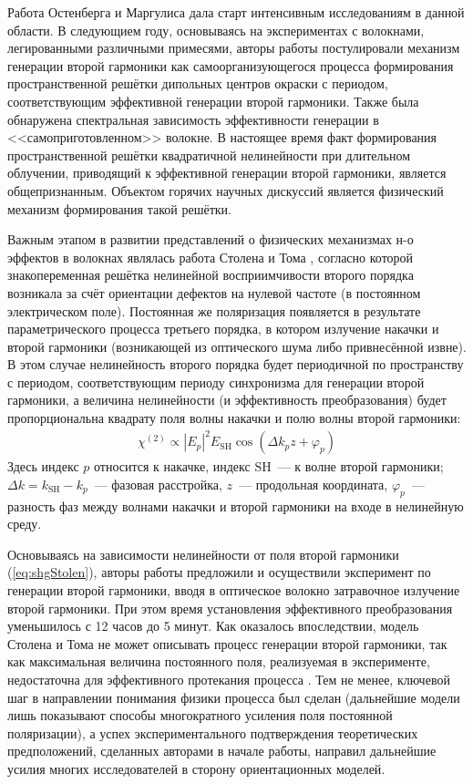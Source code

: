 Работа Остенберга и Маргулиса дала старт интенсивным исследованиям в данной области. В следующием году, основываясь на экспериментах с волокнами, легированными различными примесями, авторы работы \cite{farries1987second} постулировали механизм генерации второй гармоники как \textsf{самоорганизующегося процесса формирования пространственной решётки} дипольных центров окраски с периодом, соответствующим эффективной генерации второй гармоники. Также была обнаружена спектральная зависимость эффективности генерации в <<самоприготовленном>> волокне. В настоящее время факт формирования пространственной решётки квадратичной нелинейности при длительном облучении, приводящий к эффективной генерации второй гармоники, является общепризнанным. Объектом горячих научных дискуссий является физический механизм формирования такой решётки.

Важным этапом в развитии представлений о физических механизмах н-о эффектов в волокнах являлась работа Столена и Тома \cite{stolen1987self}, согласно которой знакопеременная решётка нелинейной восприимчивости второго порядка возникала за счёт ориентации дефектов на нулевой частоте (в постоянном электрическом поле). Постоянная же поляризация появляется в результате параметрического процесса третьего порядка, в котором излучение накачки и второй гармоники (возникающей из оптического шума либо привнесённой извне). В этом случае нелинейность второго порядка будет периодичной по пространству с периодом, соответствующим периоду синхронизма для генерации второй гармоники, а величина нелинейности (и \textsf{эффективность преобразования}) будет \textsf{пропорциональна} квадрату поля волны накачки и \textsf{полю волны второй гармоники}:
\begin{align}
	\chi^{\left(2\right)}\propto \left | E_{p}\right |  ^2 E_{\text{SH}}\cos{\left(\Delta k_p z + \varphi_p\right)}
	\label{eq:shgStolen}
\end{align}
Здесь индекс $p$ относится к накачке, индекс $\text{SH}$~--- к волне второй гармоники; $\Delta k = k_{\text{SH}}-k_{p}$~--- фазовая расстройка, $z$~--- продольная координата, $\varphi_p$~--- разность фаз между волнами накачки и второй гармоники на входе в нелинейную среду.

Основываясь на зависимости нелинейности от поля второй гармоники (\ref{eq:shgStolen}), авторы работы  \cite{stolen1987self} предложили и осуществили эксперимент по генерации второй гармоники, вводя в оптическое волокно затравочное излучение второй гармоники. При этом время установления эффективного преобразования уменьшилось с 12 часов до 5 минут. Как оказалось впоследствии, модель Столена и Тома не может описывать процесс генерации второй гармоники, так как максимальная величина постоянного поля, реализуемая в эксперименте, недостаточна для эффективного протекания процесса \cite{bergot1988generation}. Тем не менее, ключевой шаг в направлении понимания физики процесса был сделан (дальнейшие модели лишь показывают способы многократного усиления поля постоянной поляризации), а успех экспериментального подтверждения теоретических предположений, сделанных авторами в начале работы, направил дальнейшие усилия многих исследователей в сторону \textsf{ориентационных моделей}. 

